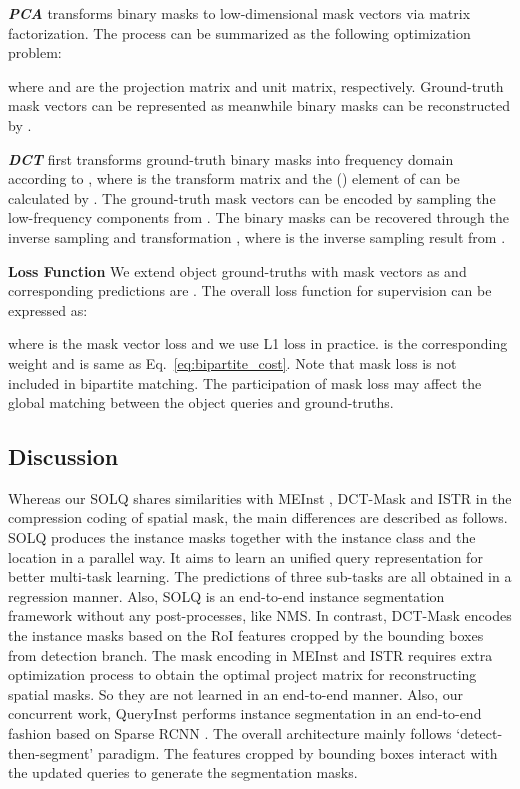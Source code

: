 \documentclass{article}
\begin{document}
\textbf{\textit{PCA}} transforms binary masks to low-dimensional mask vectors via matrix factorization. The process can be summarized as the following optimization problem:

where  and  are the projection matrix and unit matrix, respectively. Ground-truth mask vectors  can be represented as  meanwhile binary masks can be reconstructed by .

\textbf{\textit{DCT}} first transforms ground-truth binary masks  into frequency domain according to , where  is the transform matrix and the () element of  can be calculated by . 
The ground-truth mask vectors  can be encoded by sampling the low-frequency components from . The binary masks  can be recovered through the inverse sampling and transformation , where  is the inverse sampling result from .

\textbf{Loss Function}
We extend object ground-truths with mask vectors as  and corresponding predictions are . The overall loss function for supervision can be expressed as:

where  is the mask vector loss and we use L1 loss in practice.  is the corresponding weight and  is same as Eq.~\ref{eq:bipartite_cost}. Note that mask loss is not included in bipartite matching. The participation of mask loss may affect the global matching between the object queries and ground-truths.



\subsection{Discussion}
Whereas our SOLQ shares similarities with MEInst \cite{zhang2020meinst}, DCT-Mask \cite{shen2020dct} and ISTR \cite{hu2021istr} in the compression coding of spatial mask, the main differences are described as follows. SOLQ produces the instance masks together with the instance class and the location in a parallel way. It aims to learn an unified query representation for better multi-task learning. The predictions of three sub-tasks are all obtained in a regression manner. Also, SOLQ is an end-to-end instance segmentation framework without any post-processes, like NMS. In contrast, DCT-Mask encodes the instance masks based on the RoI features cropped by the bounding boxes from detection branch. The mask encoding in MEInst and ISTR requires extra optimization process to obtain the optimal project matrix for reconstructing spatial masks. So they are not learned in an end-to-end manner. Also, our concurrent work, QueryInst \cite{queryinst2021} performs instance segmentation in an end-to-end fashion based on Sparse RCNN \cite{sun2021sparsercnn}. The overall architecture mainly follows `detect-then-segment' paradigm. The features cropped by bounding boxes interact with the updated queries to generate the segmentation masks.
\end{document}
